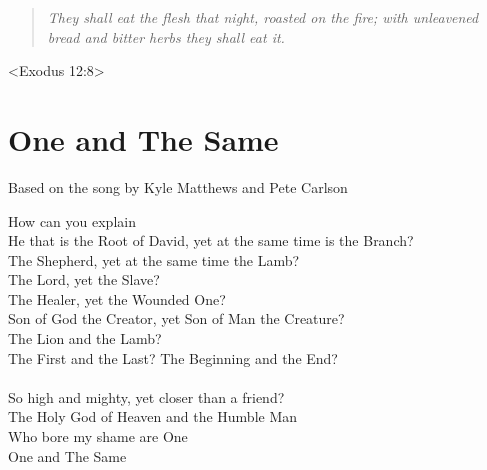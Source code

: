 \documentclass[10pt,oneside,footinclude=true,headinclude=true]{scrbook} %
\newcommand\quot[1]{
	\begin{quote}\textit{\small#1}\end{quote}
}
\begin{document}
\quot{They shall eat the flesh that night, roasted on the fire; with unleavened bread and bitter herbs they shall eat it.}
<Exodus 12:8>


\chapter{One and The Same}
Based on the song by Kyle Matthews and Pete Carlson

How can you explain\\
He that is the Root of David, yet at the same time is the Branch?\\
The Shepherd, yet at the same time the Lamb?\\
The Lord, yet the Slave?\\
The Healer, yet the Wounded One?\\
Son of God the Creator, yet Son of Man the Creature?\\
The Lion and the Lamb?\\
The First and the Last? The Beginning and the End?\\
\\
So high and mighty, yet closer than a friend?\\
The Holy God of Heaven and the Humble Man\\
Who bore my shame are One\\
One and The Same\\
\end{document}

